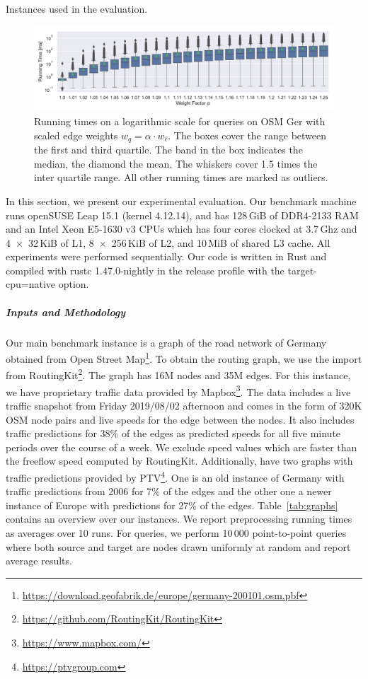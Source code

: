 \documentclass[letterpaper]{article} %
\begin{document}
\label{sec:experiments}

\begin{table}
\centering
\caption{Instances used in the evaluation.}\label{tab:graphs}

\end{table}

\begin{figure}
\centering
\includegraphics[width=\textwidth]{fig/scaled_weights.pdf}
\caption{
Running times on a logarithmic scale for queries on OSM Ger with scaled edge weights $w_q = \alpha \cdot w_\ell$.
The boxes cover the range between the first and third quartile.
The band in the box indicates the median, the diamond the mean.
The whiskers cover 1.5 times the inter quartile range.
All other running times are marked as outliers.
}\label{fig:scaled_weights}
\end{figure}

In this section, we present our experimental evaluation.
Our benchmark machine runs openSUSE Leap 15.1 (kernel 4.12.14), and has 128\,GiB of DDR4-2133 RAM and an Intel Xeon E5-1630 v3 CPUs which has four cores clocked at 3.7\,Ghz and 4~$\times$~32\,KiB of L1, 8~$\times$~256\,KiB of L2, and 10\,MiB of shared L3 cache.
All experiments were performed sequentially.
Our code is written in Rust and compiled with rustc 1.47.0-nightly in the release profile with the target-cpu=native option.

\subparagraph{Inputs and Methodology}
Our main benchmark instance is a graph of the road network of Germany obtained from Open Street Map\footnote{\url{https://download.geofabrik.de/europe/germany-200101.osm.pbf}}.
To obtain the routing graph, we use the import from RoutingKit\footnote{\url{https://github.com/RoutingKit/RoutingKit}}.
The graph has 16M nodes and 35M edges.
For this instance, we have proprietary traffic data provided by Mapbox\footnote{\url{https://www.mapbox.com/}}.
The  data includes a live traffic snapshot from Friday 2019/08/02 afternoon and comes in the form of 320K OSM node pairs and live speeds for the edge between the nodes.
It also includes traffic predictions for 38\% of the edges as predicted speeds for all five minute periods over the course of a week.
We exclude speed values which are faster than the freeflow speed computed by RoutingKit.
Additionally, have two graphs with traffic predictions provided by PTV\footnote{\url{https://ptvgroup.com}}.
One is an old instance of Germany with traffic predictions from 2006 for 7\% of the edges and the other one a newer instance of Europe with predictions for 27\% of the edges.
Table~\ref{tab:graphs} contains an overview over our instances.
We report preprocessing running times as averages over 10 runs.
For queries, we perform 10\,000 point-to-point queries where both source and target are nodes drawn uniformly at random and report average results.
\end{document}
